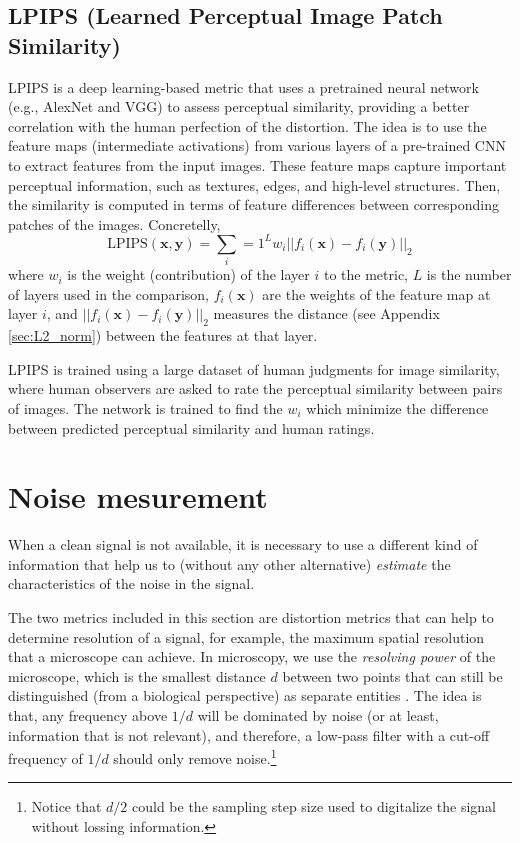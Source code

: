 \documentclass{article}
\begin{document}

\subsection{LPIPS (Learned Perceptual Image Patch Similarity)}

LPIPS \cite{zhang2018unreasonable} is a deep learning-based metric that
uses a pretrained neural network (e.g., AlexNet and VGG) to assess
perceptual similarity, providing a better correlation with the human
perfection of the distortion. The idea is to use the feature maps
(intermediate activations) from various layers of a pre-trained CNN to
extract features from the input images. These feature maps capture
important perceptual information, such as textures, edges, and
high-level structures. Then, the similarity is computed in terms of
feature differences between corresponding patches of the
images. Concretelly,
\begin{equation}
  \text{LPIPS}(\mathbf{x}, \mathbf{y}) = \sum_i=1^Lw_i||f_i(\mathbf{x}) - f_i(\mathbf{y})||_2
\end{equation}
where $w_i$ is the weight (contribution) of the layer $i$ to the
metric, $L$ is the number of layers used in the comparison,
$f_i(\mathbf{x})$ are the weights of the feature map at layer $i$, and
$||f_i(\mathbf{x}) - f_i(\mathbf{y})||_2$ measures the distance (see
Appendix \ref{sec:L2_norm}) between the features at that layer.

LPIPS is trained using a large dataset of human judgments for image
similarity, where human observers are asked to rate the perceptual
similarity between pairs of images. The network is trained to find the
$w_i$ which minimize the difference between predicted perceptual
similarity and human ratings.



\section{Noise mesurement}

When a clean signal is not available, it is necessary to use a
different kind of information that help us to (without any other
alternative) \emph{estimate} the characteristics of the noise in the
signal.

The two metrics included in this section are distortion metrics that
can help to determine resolution of a signal, for example, the maximum
spatial resolution that a microscope can achieve. In microscopy, we
use the \emph{resolving power} of the microscope, which is the
smallest distance $d$ between two points that can still be
distinguished (from a biological perspective) as separate entities
\cite{nieuwenhuizen2013measuring}. The idea is that, any frequency
above $1/d$ will be dominated by noise (or at least, information that
is not relevant), and therefore, a low-pass filter with a cut-off
frequency of $1/d$ should only remove noise.\footnote{Notice that
  $d/2$ could be the sampling step size used to digitalize the signal
  without lossing information.}
\end{document}
